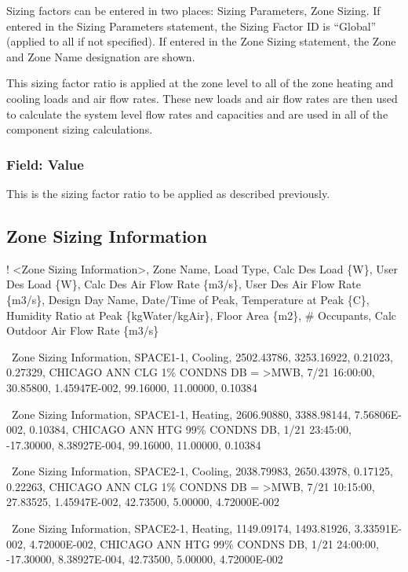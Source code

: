 Sizing factors can be entered in two places: Sizing Parameters, Zone Sizing. If entered in the Sizing Parameters statement, the Sizing Factor ID is ``Global'' (applied to all if not specified). If entered in the Zone Sizing statement, the Zone and Zone Name designation are shown.

This sizing factor ratio is applied at the zone level to all of the zone heating and cooling loads and air flow rates. These new loads and air flow rates are then used to calculate the system level flow rates and capacities and are used in all of the component sizing calculations.

\subsubsection{Field: Value}\label{field-value}

This is the sizing factor ratio to be applied as described previously.

\subsection{Zone Sizing Information}\label{zone-sizing-information}

! \textless{}Zone Sizing Information\textgreater{}, Zone Name, Load Type, Calc Des Load \{W\}, User Des Load \{W\}, Calc Des Air Flow Rate \{m3/s\}, User Des Air Flow Rate \{m3/s\}, Design Day Name, Date/Time of Peak, Temperature at Peak \{C\}, Humidity Ratio at Peak \{kgWater/kgAir\}, Floor Area \{m2\}, \# Occupants, Calc Outdoor Air Flow Rate \{m3/s\}

~Zone Sizing Information, SPACE1-1, Cooling, 2502.43786, 3253.16922, 0.21023, 0.27329, CHICAGO ANN CLG 1\% CONDNS DB = \textgreater{}MWB, 7/21 16:00:00, 30.85800, 1.45947E-002, 99.16000, 11.00000, 0.10384

~Zone Sizing Information, SPACE1-1, Heating, 2606.90880, 3388.98144, 7.56806E-002, 0.10384, CHICAGO ANN HTG 99\% CONDNS DB, 1/21 23:45:00, -17.30000, 8.38927E-004, 99.16000, 11.00000, 0.10384

~Zone Sizing Information, SPACE2-1, Cooling, 2038.79983, 2650.43978, 0.17125, 0.22263, CHICAGO ANN CLG 1\% CONDNS DB = \textgreater{}MWB, 7/21 10:15:00, 27.83525, 1.45947E-002, 42.73500, 5.00000, 4.72000E-002

~Zone Sizing Information, SPACE2-1, Heating, 1149.09174, 1493.81926, 3.33591E-002, 4.72000E-002, CHICAGO ANN HTG 99\% CONDNS DB, 1/21 24:00:00, -17.30000, 8.38927E-004, 42.73500, 5.00000, 4.72000E-002

